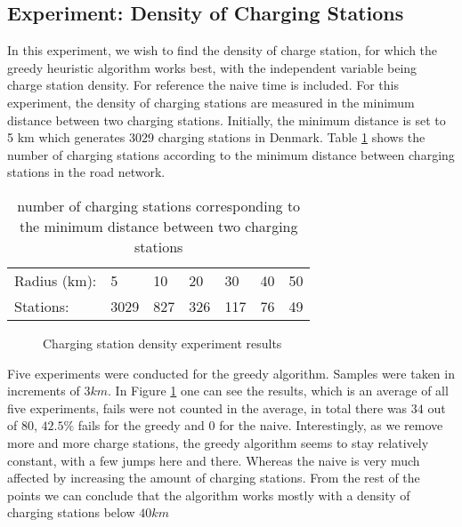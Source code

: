 \subsection{Experiment: Density of Charging Stations}
In this experiment, we wish to find the density of charge station, for which the greedy heuristic algorithm works best, with the independent variable being charge station density. For reference the naive time is included. For this experiment, the density of charging stations are measured in the minimum distance between two charging stations. Initially, the minimum distance is set to 5 km which generates 3029 charging stations in Denmark. Table \ref{table:chargedensity} shows the number of charging stations according to the minimum distance between charging stations in the road network.

\begin{table}[!htb]
\centering
		\begin{tabular}{ p{1.85cm} p{0.67cm} p{0.63cm} p{0.63cm} p{0.63cm} p{0.63cm} p{0.63cm} }
        \hline 
		Radius (km): & 5 & 10 & 20 & 30 & 40 & 50 \\ 
		Stations: & 3029 & 827 & 326 & 117 & 76 & 49 \\
        \hline
		\end{tabular}
		\caption{number of charging stations corresponding to the minimum distance between two charging stations}
	\label{table:chargedensity}
	\end{table}

\begin{figure}[!htb]
\centering
{}
\caption{Charging station density experiment results} 
\label{fig:cs_density}
\end{figure}


Five experiments were conducted for the greedy algorithm. Samples were taken in increments of $3\si{km}$. In Figure \ref{fig:cs_density} one can see the results, which is an average of all five experiments, fails were not counted in the average, in total there was $34$ out of $80$, $42.5\%$ fails for the greedy and $0$ for the naive. Interestingly, as we remove more and more charge stations, the greedy algorithm seems to stay relatively constant, with a few jumps here and there. Whereas the naive is very much affected by increasing the amount of charging stations. From the rest of the points we can conclude that the algorithm works mostly with a density of charging stations below $40\si{km}$


